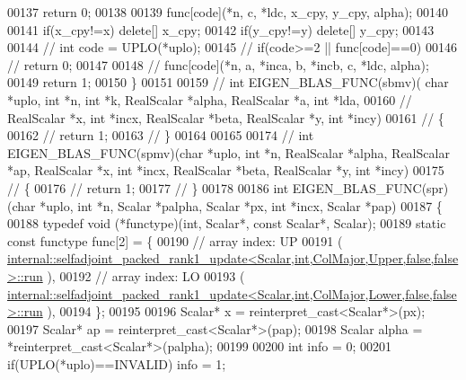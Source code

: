 \begin{DoxyCode}
00137     \textcolor{keywordflow}{return} 0;
00138 
00139   func[code](*n, c, *ldc, x\_cpy, y\_cpy, alpha);
00140 
00141   \textcolor{keywordflow}{if}(x\_cpy!=x)  \textcolor{keyword}{delete}[] x\_cpy;
00142   \textcolor{keywordflow}{if}(y\_cpy!=y)  \textcolor{keyword}{delete}[] y\_cpy;
00143 
00144 \textcolor{comment}{//   int code = UPLO(*uplo);}
00145 \textcolor{comment}{//   if(code>=2 || func[code]==0)}
00146 \textcolor{comment}{//     return 0;}
00147 
00148 \textcolor{comment}{//   func[code](*n, a, *inca, b, *incb, c, *ldc, alpha);}
00149   \textcolor{keywordflow}{return} 1;
00150 \}
00151 
00159 \textcolor{comment}{// int EIGEN\_BLAS\_FUNC(sbmv)( char *uplo, int *n, int *k, RealScalar *alpha, RealScalar *a, int *lda,}
00160 \textcolor{comment}{//                            RealScalar *x, int *incx, RealScalar *beta, RealScalar *y, int *incy)}
00161 \textcolor{comment}{// \{}
00162 \textcolor{comment}{//   return 1;}
00163 \textcolor{comment}{// \}}
00164 
00165 
00174 \textcolor{comment}{// int EIGEN\_BLAS\_FUNC(spmv)(char *uplo, int *n, RealScalar *alpha, RealScalar *ap, RealScalar *x, int
       *incx, RealScalar *beta, RealScalar *y, int *incy)}
00175 \textcolor{comment}{// \{}
00176 \textcolor{comment}{//   return 1;}
00177 \textcolor{comment}{// \}}
00178 
00186 \textcolor{keywordtype}{int} EIGEN\_BLAS\_FUNC(spr)(\textcolor{keywordtype}{char} *uplo, \textcolor{keywordtype}{int} *n, Scalar *palpha, Scalar *px, \textcolor{keywordtype}{int} *incx, Scalar *pap)
00187 \{
00188   \textcolor{keyword}{typedef} void (*functype)(int, Scalar*, \textcolor{keyword}{const} Scalar*, Scalar);
00189   \textcolor{keyword}{static} \textcolor{keyword}{const} functype func[2] = \{
00190     \textcolor{comment}{// array index: UP}
00191     (
      \hyperlink{structinternal_1_1selfadjoint__packed__rank1__update}{internal::selfadjoint\_packed\_rank1\_update<Scalar,int,ColMajor,Upper,false,false>::run}
      ),
00192     \textcolor{comment}{// array index: LO}
00193     (
      \hyperlink{structinternal_1_1selfadjoint__packed__rank1__update}{internal::selfadjoint\_packed\_rank1\_update<Scalar,int,ColMajor,Lower,false,false>::run}
      ),
00194   \};
00195 
00196   Scalar* x = \textcolor{keyword}{reinterpret\_cast<}Scalar*\textcolor{keyword}{>}(px);
00197   Scalar* ap = \textcolor{keyword}{reinterpret\_cast<}Scalar*\textcolor{keyword}{>}(pap);
00198   Scalar alpha = *\textcolor{keyword}{reinterpret\_cast<}Scalar*\textcolor{keyword}{>}(palpha);
00199 
00200   \textcolor{keywordtype}{int} info = 0;
00201   \textcolor{keywordflow}{if}(UPLO(*uplo)==INVALID)                                            info = 1;

\end{DoxyCode}
